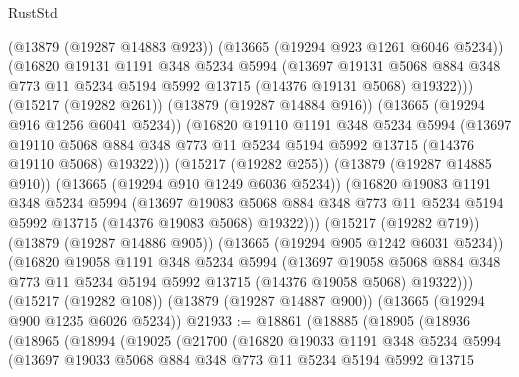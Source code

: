 \begin{lexlean}{RustStd}
\begin{coremodule}
            (@13879 (@19287 @14883 @923))
            (@13665 (@19294 @923 @1261 @6046 @5234))
            (@16820
              @19131
              @1191
              @348
              @5234
              @5994
              (@13697
                @19131
                @5068
                @884
                @348
                @773
                @11
                @5234
                @5194
                @5992
                @13715
                (@14376 @19131 @5068)
                @19322)))
          (@15217 (@19282 @261))
          (@13879 (@19287 @14884 @916))
          (@13665 (@19294 @916 @1256 @6041 @5234))
          (@16820
            @19110
            @1191
            @348
            @5234
            @5994
            (@13697
              @19110
              @5068
              @884
              @348
              @773
              @11
              @5234
              @5194
              @5992
              @13715
              (@14376 @19110 @5068)
              @19322)))
        (@15217 (@19282 @255))
        (@13879 (@19287 @14885 @910))
        (@13665 (@19294 @910 @1249 @6036 @5234))
        (@16820
          @19083
          @1191
          @348
          @5234
          @5994
          (@13697
            @19083
            @5068
            @884
            @348
            @773
            @11
            @5234
            @5194
            @5992
            @13715
            (@14376 @19083 @5068)
            @19322)))
      (@15217 (@19282 @719))
      (@13879 (@19287 @14886 @905))
      (@13665 (@19294 @905 @1242 @6031 @5234))
      (@16820
        @19058
        @1191
        @348
        @5234
        @5994
        (@13697
          @19058
          @5068
          @884
          @348
          @773
          @11
          @5234
          @5194
          @5992
          @13715
          (@14376 @19058 @5068)
          @19322)))
    (@15217 (@19282 @108))
    (@13879 (@19287 @14887 @900))
    (@13665 (@19294 @900 @1235 @6026 @5234))
@21933 := @18861
    (@18885
      (@18905
        (@18936
          (@18965
            (@18994
              (@19025
                (@21700
                  (@16820
                    @19033
                    @1191
                    @348
                    @5234
                    @5994
                    (@13697
                      @19033
                      @5068
                      @884
                      @348
                      @773
                      @11
                      @5234
                      @5194
                      @5992
                      @13715

\end{coremodule}
\end{lexlean}
